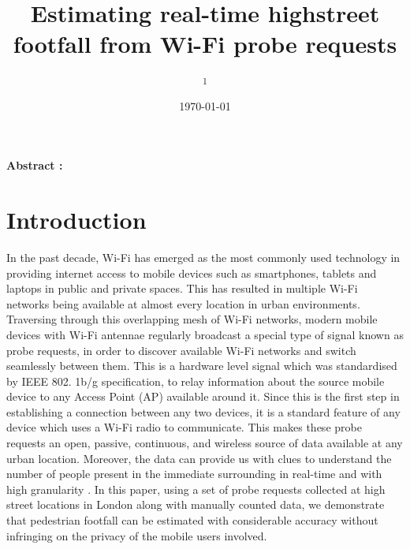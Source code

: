 \documentclass[11t, a4paper, twocolumn]{article}
\title{Estimating real-time highstreet  footfall from Wi-Fi probe requests}
\author{
	\authorstyle{
		Balamurugan Soundararaj\textsuperscript{1}, 
		James Cheshire\textsuperscript{1} and 
		Paul Longley\textsuperscript{1}}
	\newline\newline
	\textsuperscript{1}\institution{
		Department of Geography, 
		University College London, 
		United Kingdom}
}
\date{\today}
\begin{document}
	\maketitle
	\thispagestyle{firstpage}

	\textbf{Abstract : }

	\section{Introduction}\label{intro}

		In the past decade, Wi-Fi has emerged as the most commonly used technology in providing internet access to mobile devices such as smartphones, tablets and laptops in public and private spaces.
		This has resulted in multiple Wi-Fi networks being available at almost every location in urban environments.
		Traversing through this overlapping mesh of Wi-Fi networks, modern mobile devices with Wi-Fi antennae regularly broadcast a special type of signal known as probe requests, in order to discover available Wi-Fi networks and switch seamlessly between them.
		This is a hardware level signal which was standardised by IEEE 802.
		1b/g specification, to relay information about the source mobile device to any Access Point (AP) available around it.
		Since this is the first step in establishing a connection between any two devices, it is a standard feature of any device which uses a Wi-Fi radio to communicate.
		This makes these probe requests an open, passive, continuous, and wireless source of data available at any urban location.
		Moreover, the data can provide us with clues to understand the number of people present in the immediate surrounding in real-time and with high granularity \citep{freud2015,konto2017}.
		In this paper, using a set of probe requests collected at high street locations in London along with manually counted data, we demonstrate that pedestrian footfall can be estimated with considerable accuracy without infringing on the privacy of the mobile users involved.
		
\end{document}
